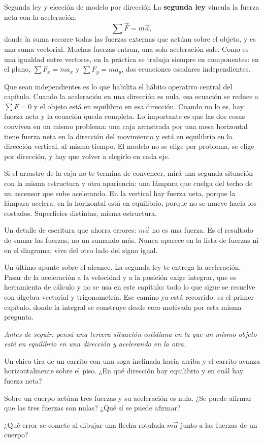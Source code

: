 \documentclass[11pt,openany]{book}
\begin{document}
\begin{bloque}{Segunda ley y elección de modelo por dirección}
La \textbf{segunda ley} vincula la fuerza neta con la aceleración:
\[
\sum \vec F = m\vec a,
\]
donde la suma recorre todas las fuerzas externas que actúan sobre el objeto, y es una suma vectorial. Muchas fuerzas entran, una sola aceleración sale. Como es una igualdad entre vectores, en la práctica se trabaja siempre en componentes: en el plano, $\sum F_x = ma_x$ y $\sum F_y = ma_y$, dos ecuaciones escalares independientes.

Que sean independientes es lo que habilita el hábito operativo central del capítulo. Cuando la aceleración en una dirección es nula, esa ecuación se reduce a $\sum F = 0$ y el objeto está en equilibrio en esa dirección. Cuando no lo es, hay fuerza neta y la ecuación queda completa. Lo importante es que las dos cosas conviven en un mismo problema: una caja arrastrada por una mesa horizontal tiene fuerza neta en la dirección del movimiento y está en equilibrio en la dirección vertical, al mismo tiempo. El modelo no se elige por problema, se elige por dirección, y hay que volver a elegirlo en cada eje.

Si el arrastre de la caja no te termina de convencer, mirá una segunda situación con la misma estructura y otra apariencia: una lámpara que cuelga del techo de un ascensor que sube acelerando. En la vertical hay fuerza neta, porque la lámpara acelera; en la horizontal está en equilibrio, porque no se mueve hacia los costados. Superficies distintas, misma estructura.

Un detalle de escritura que ahorra errores: $m\vec a$ no es una fuerza. Es el resultado de sumar las fuerzas, no un sumando más. Nunca aparece en la lista de fuerzas ni en el diagrama; vive del otro lado del signo igual.

Un último apunte sobre el alcance. La segunda ley te entrega la aceleración. Pasar de la aceleración a la velocidad y a la posición exige integrar, que es herramienta de cálculo y no se usa en este capítulo: todo lo que sigue se resuelve con álgebra vectorial y trigonometría. Ese camino ya está recorrido: es el primer capítulo, donde la integral se construye desde cero motivada por esta misma pregunta.

\textit{Antes de seguir: pensá una tercera situación cotidiana en la que un mismo objeto esté en equilibrio en una dirección y acelerando en la otra.}
\end{bloque}

\begin{chequeo}
\item Un chico tira de un carrito con una soga inclinada hacia arriba y el carrito avanza horizontalmente sobre el piso. ¿En qué dirección hay equilibrio y en cuál hay fuerza neta?
\item Sobre un cuerpo actúan tres fuerzas y su aceleración es nula. ¿Se puede afirmar que las tres fuerzas son nulas? ¿Qué sí se puede afirmar?
\item ¿Qué error se comete al dibujar una flecha rotulada $m\vec a$ junto a las fuerzas de un cuerpo?
\end{chequeo}
\end{document}
